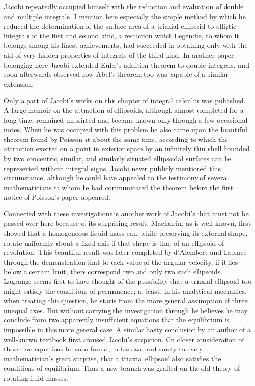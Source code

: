 \documentclass[11pt]{article}
\begin{document}
Jacobi repeatedly occupied himself with the reduction and evaluation of double and multiple integrals. I mention here especially the simple method by which he reduced the determination of the surface area of a triaxial ellipsoid to elliptic integrals of the first and second kind, a reduction which Legendre, to whom it belongs among his finest achievements, had succeeded in obtaining only with the aid of very hidden properties of integrals of the third kind. In another paper belonging here Jacobi extended Euler's addition theorem to double integrals, and soon afterwards observed how Abel's theorem too was capable of a similar extension.

Only a part of Jacobi's works on this chapter of integral calculus was published. A large memoir on the attraction of ellipsoids, although almost completed for a long time, remained unprinted and became known only through a few occasional notes. When he was occupied with this problem he also came upon the beautiful theorem found by Poisson at about the same time, according to which the attraction exerted on a point in exterior space by an infinitely thin shell bounded by two concentric, similar, and similarly situated ellipsoidal surfaces can be represented without integral signs. Jacobi never publicly mentioned this circumstance, although he could have appealed to the testimony of several mathematicians to whom he had communicated the theorem before the first notice of Poisson's paper appeared.

Connected with these investigations is another work of Jacobi's that must not be passed over here because of its surprising result. Maclaurin, as is well known, first showed that a homogeneous liquid mass can, while preserving its external shape, rotate uniformly about a fixed axis if that shape is that of an ellipsoid of revolution. This beautiful result was later completed by d'Alembert and Laplace through the demonstration that to each value of the angular velocity, if it lies below a certain limit, there correspond two and only two such ellipsoids. Lagrange seems first to have thought of the possibility that a triaxial ellipsoid too might satisfy the conditions of permanence; at least, in his analytical mechanics, when treating this question, he starts from the more general assumption of three unequal axes. But without carrying the investigation through he believes he may conclude from two apparently insufficient equations that the equilibrium is impossible in this more general case. A similar hasty conclusion by an author of a well-known textbook first aroused Jacobi's suspicion. On closer consideration of those two equations he soon found, to his own and surely to every mathematician's great surprise, that a triaxial ellipsoid also satisfies the conditions of equilibrium. Thus a new branch was grafted on the old theory of rotating fluid masses.
\end{document}
